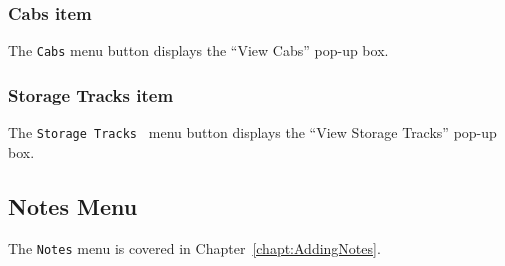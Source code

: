 \subsubsection{Cabs item}

The {\tt Cabs} menu button displays the ``View Cabs'' pop-up box.

\subsubsection{Storage Tracks item}

The {\tt Storage Tracks } menu button displays the ``View Storage
Tracks'' pop-up box.

\subsection{Notes Menu}

The {\tt Notes} menu is covered in Chapter~\ref{chapt:AddingNotes}.

